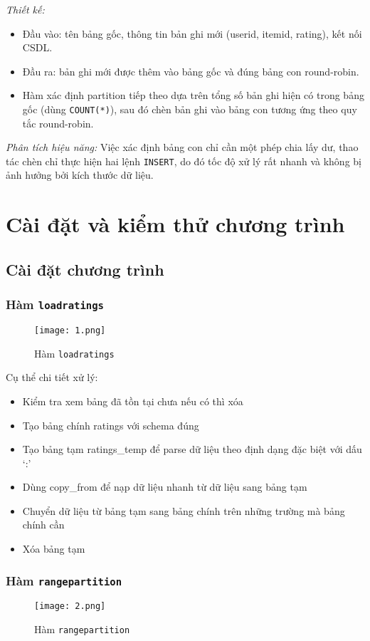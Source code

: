 \documentclass[a4paper]{article}
\begin{document}
\textit{Thiết kế:}
\begin{itemize}
    \item Đầu vào: tên bảng gốc, thông tin bản ghi mới (userid, itemid, rating), kết nối CSDL.
    \item Đầu ra: bản ghi mới được thêm vào bảng gốc và đúng bảng con round-robin.
    \item Hàm xác định partition tiếp theo dựa trên tổng số bản ghi hiện có trong bảng gốc (dùng \texttt{COUNT(*)}), sau đó chèn bản ghi vào bảng con tương ứng theo quy tắc round-robin.
\end{itemize}
\textit{Phân tích hiệu năng:}  
Việc xác định bảng con chỉ cần một phép chia lấy dư, thao tác chèn chỉ thực hiện hai lệnh \texttt{INSERT}, do đó tốc độ xử lý rất nhanh và không bị ảnh hưởng bởi kích thước dữ liệu.
\newpage

\section{Cài đặt và kiểm thử chương trình}
\subsection{Cài đặt chương trình}
\subsubsection{Hàm \texttt{loadratings}}
\begin{figure}[H]
    \centering
    \texttt{[image: 1.png]}
    \caption{Hàm \texttt{loadratings}}

\end{figure}
Cụ thể chi tiết xử lý:
\begin{itemize}
    \item Kiểm tra xem bảng đã tồn tại chưa nếu có thì xóa
    \item Tạo bảng chính ratings với schema đúng
    \item Tạo bảng tạm ratings\_temp để parse dữ liệu theo định dạng đặc biệt với dấu ‘:’
    \item Dùng copy\_from để nạp dữ liệu nhanh từ dữ liệu sang bảng tạm
    \item Chuyển dữ liệu từ bảng tạm sang bảng chính trên những trường mà bảng chính cần
    \item Xóa bảng tạm
\end{itemize}

\subsubsection{Hàm \texttt{rangepartition}}
\begin{figure}[H]
    \centering
    \texttt{[image: 2.png]}
    \caption{Hàm \texttt{rangepartition}}
    
\end{figure}
\end{document}
